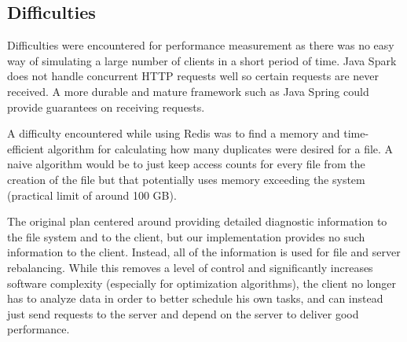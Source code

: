 \documentclass[twoside]{article}
\begin{document}
\begin{multicols}{2}
\section{Difficulties}
Difficulties were encountered for performance measurement as there was no easy way of simulating a large number of clients in a short period of time. Java Spark does not handle concurrent HTTP requests well so certain requests are never received. A more durable and mature framework such as Java Spring could provide guarantees on receiving requests. 

A difficulty encountered while using Redis was to find a memory and time-efficient algorithm for calculating how many duplicates were desired for a file. A naive algorithm would be to just keep access counts for every file from the creation of the file but that potentially uses memory exceeding the system (practical limit of around 100 GB).

The original plan centered around providing detailed diagnostic information to the file system and to the client, but our implementation provides no such information to the client. Instead, all of the information is used for file and server rebalancing. While this removes a level of control and significantly increases software complexity (especially for optimization algorithms), the client no longer has to analyze data in order to better schedule his own tasks, and can instead just send requests to the server and depend on the server to deliver good performance.



\end{multicols}
\end{document}
